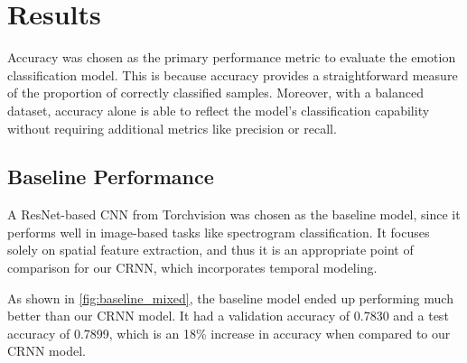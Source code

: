 \documentclass[../main.tex]{subfiles}
\begin{document}
\section{Results}
Accuracy was chosen as the primary performance metric to evaluate the emotion 
classification model. This is because accuracy provides a straightforward 
measure of the proportion of correctly classified samples. Moreover, with a 
balanced dataset, accuracy alone is able to reflect the model's 
classification capability without requiring additional metrics like precision 
or recall.

\subsection{Baseline Performance}

A ResNet-based CNN from Torchvision was chosen as the baseline model, since it performs well in image-based tasks like spectrogram 
classification. It focuses solely on spatial feature 
extraction, and thus it is an appropriate point of comparison for our CRNN, 
which incorporates temporal modeling.

As shown in \autoref{fig:baseline_mixed}, the baseline model ended up performing much 
better than our CRNN model. It had a validation accuracy of 0.7830 and a 
test accuracy of 0.7899, which is an 18\% increase in accuracy when compared to 
our CRNN model.
\end{document}
